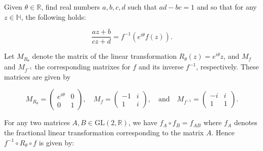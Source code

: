 Given $\theta \in \mathbb{R}$, find real numbers $a, b, c, d$ such that $ad - bc = 1$ and so that for any 
$z \in \mathbb{H}$, the following holds:

$$
\frac{az + b}{cz + d} = f^{-1} \left(e^{i \theta} f(z) \right).
$$

\newcommand{\hangle}[1][]{e^{#1 i\frac{\theta}{2}}}

\begin{solution}
  Let $M_{R_\theta}$ denote the matrix of the linear transformation $R_{\theta}(z) = e^{i \theta} z$, and $M_f$ and 
  $M_{f^{-1}}$ the corresponding matrixes for $f$ and its inverse $f^{-1}$, respectively. These matrices are given by

  $$
  M_{R_\theta} = \begin{pmatrix}
    e^{i \theta} & 0 \\
    0            & 1
  \end{pmatrix}, \quad M_f = \begin{pmatrix}
    -1 & i \\
     1 & i
  \end{pmatrix}, \quad \text{and} \quad M_{f^{-1}} = \begin{pmatrix}
    -i & i \\
     1 & 1
  \end{pmatrix}.
  $$
 
  For any two matrices $A, B \in \text{GL}(2, \mathbb{R})$, we have $f_A \circ f_B = f_{AB}$ where $f_A$ denotes the 
  fractional linear transformation corresponding to the matrix $A$. Hence $f^{-1} \circ R_{\theta} \circ f$ is given by:


\end{solution}
